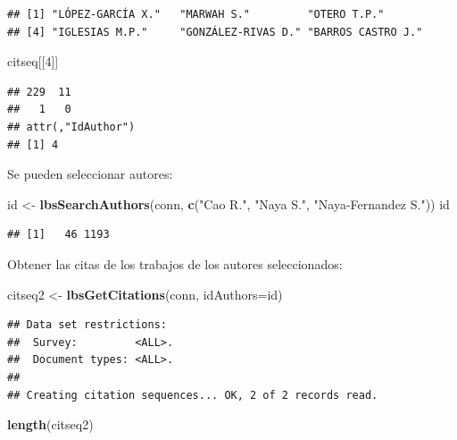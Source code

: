 \documentclass[
]{book}
\newenvironment{Shaded}{\begin{snugshade}}{\end{snugshade}}
\newcommand{\DataTypeTok}[1]{\textcolor[rgb]{0.13,0.29,0.53}{#1}}
\newcommand{\DecValTok}[1]{\textcolor[rgb]{0.00,0.00,0.81}{#1}}
\newcommand{\KeywordTok}[1]{\textcolor[rgb]{0.13,0.29,0.53}{\textbf{#1}}}
\newcommand{\NormalTok}[1]{#1}
\newcommand{\StringTok}[1]{\textcolor[rgb]{0.31,0.60,0.02}{#1}}
\begin{document}
\begin{verbatim}
## [1] "LÓPEZ-GARCÍA X."   "MARWAH S."         "OTERO T.P."       
## [4] "IGLESIAS M.P."     "GONZÁLEZ-RIVAS D." "BARROS CASTRO J."
\end{verbatim}

\begin{Shaded}
\begin{Highlighting}[]
\NormalTok{citseq[[}\DecValTok{4}\NormalTok{]]}
\end{Highlighting}
\end{Shaded}

\begin{verbatim}
## 229  11 
##   1   0 
## attr(,"IdAuthor")
## [1] 4
\end{verbatim}

Se pueden seleccionar autores:

\begin{Shaded}
\begin{Highlighting}[]
\NormalTok{id <-}\StringTok{ }\KeywordTok{lbsSearchAuthors}\NormalTok{(conn, }\KeywordTok{c}\NormalTok{(}\StringTok{"Cao R."}\NormalTok{, }\StringTok{"Naya S."}\NormalTok{, }\StringTok{"Naya-Fernandez S."}\NormalTok{))}
\NormalTok{id}
\end{Highlighting}
\end{Shaded}

\begin{verbatim}
## [1]   46 1193
\end{verbatim}

Obtener las citas de los trabajos de los autores seleccionados:

\begin{Shaded}
\begin{Highlighting}[]
\NormalTok{citseq2 <-}\StringTok{ }\KeywordTok{lbsGetCitations}\NormalTok{(conn, }\DataTypeTok{idAuthors=}\NormalTok{id)}
\end{Highlighting}
\end{Shaded}

\begin{verbatim}
## Data set restrictions:
##  Survey:         <ALL>.
##  Document types: <ALL>.
## 
## Creating citation sequences... OK, 2 of 2 records read.
\end{verbatim}

\begin{Shaded}
\begin{Highlighting}[]
\KeywordTok{length}\NormalTok{(citseq2)}
\end{Highlighting}
\end{Shaded}
\end{document}
